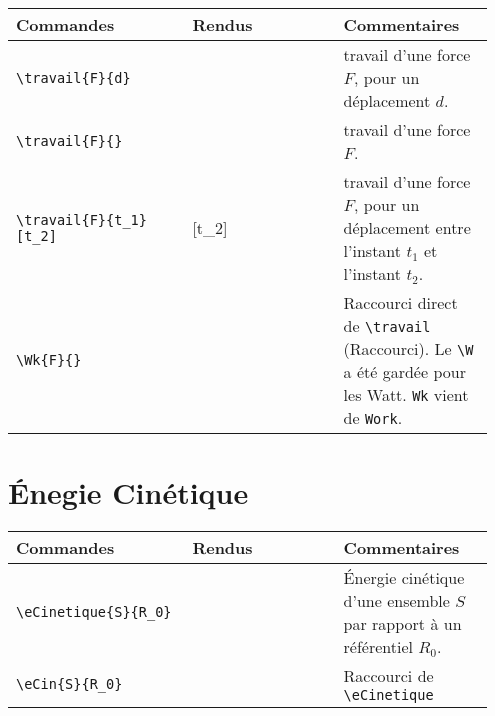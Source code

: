 \documentclass[a4paper,10pt]{article}
\newcommand{\rac}{({\color{red}Raccourci})}
\begin{document}
	\begin{tabular}{|p{0.35\linewidth}|p{0.3\linewidth}|p{0.3\linewidth}|}
		\hline
			\textbf{Commandes}&\textbf{Rendus}&\textbf{Commentaires}
		\\\hline\hline
			\verb!\travail{F}{d}!		&	\travail{F}{d}			&	travail d'une force $F$, pour un déplacement $d$.
		\\\hline
			\verb!\travail{F}{}!		&	\travail{F}{}			&	travail d'une force $F$.
		\\\hline
			\verb!\travail{F}{t_1}[t_2]!	&	\travail{F}{t_1}[t_2]		&	travail d'une force $F$, pour un déplacement entre l'instant $t_1$ et l'instant $t_2$.
		\\\hline
			\verb!\Wk{F}{}!			&	\Wk{F}{}			&	Raccourci direct de \verb!\travail! \rac. Le \verb!\W! a été gardée pour les Watt. \verb!Wk! vient de \verb!Work!.
		\\\hline
	\end{tabular}

	\section{Énegie Cinétique}
	
	\noindent
	\begin{tabular}{|p{0.35\linewidth}|p{0.3\linewidth}|p{0.3\linewidth}|}
		\hline
			\textbf{Commandes}&\textbf{Rendus}&\textbf{Commentaires}
		\\\hline\hline
			\verb!\eCinetique{S}{R_0}!		&	\eCinetique{S}{R_0}			&	Énergie cinétique d'une ensemble $S$ par rapport à un référentiel $R_0$. 
		\\\hline
			\verb!\eCin{S}{R_0}!		&	\eCin{S}{R_0}			&	Raccourci de \verb!\eCinetique!
		\\\hline
	\end{tabular}
	
	
	
\end{document}
